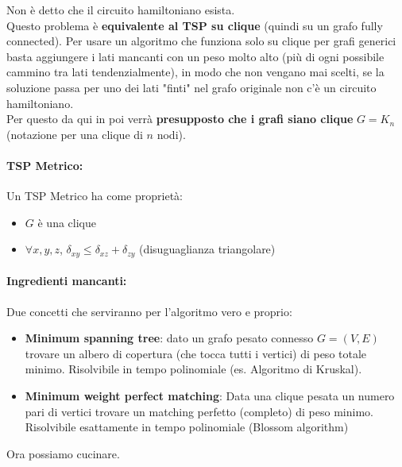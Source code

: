Non è detto che il circuito hamiltoniano esista.\\

Questo problema è \textbf{equivalente al TSP su clique} (quindi su un grafo fully connected). Per usare un algoritmo che funziona solo su clique per grafi generici basta aggiungere i lati mancanti con un peso molto alto (più di ogni possibile cammino tra lati tendenzialmente), in modo che non vengano mai scelti, se la soluzione passa per uno dei lati "finti" nel grafo originale non c'è un circuito hamiltoniano.\\

Per questo da qui in poi verrà \textbf{presupposto che i grafi siano clique} $G = K_n$ (notazione per una clique di $n$ nodi).\\

\newpage

\paragraph{TSP Metrico:} Un TSP Metrico ha come proprietà:
\begin{itemize}
	\item $G$ è una clique 
	\item $\forall x,y,z$, $\delta_{xy} \leq \delta_{xz} + \delta_{zy}$ (disuguaglianza triangolare)
\end{itemize}

\nn

\paragraph{Ingredienti mancanti: } Due concetti che serviranno per l'algoritmo vero e proprio:
\begin{itemize}
	\item \textbf{Minimum spanning tree}: dato un grafo pesato connesso $G = (V,E)$ trovare un albero di copertura (che tocca tutti i vertici) di peso totale minimo. Risolvibile in tempo polinomiale (es. Algoritmo di Kruskal).\\
	
	\item \textbf{Minimum weight perfect matching}: Data una clique pesata un numero pari di vertici trovare un matching perfetto (completo) di peso minimo. Risolvibile esattamente in tempo polinomiale (Blossom algorithm)
\end{itemize}

Ora possiamo cucinare.\\

